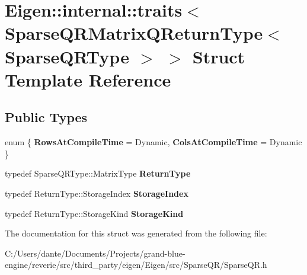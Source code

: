 \hypertarget{struct_eigen_1_1internal_1_1traits_3_01_sparse_q_r_matrix_q_return_type_3_01_sparse_q_r_type_01_4_01_4}{}\section{Eigen\+::internal\+::traits$<$ Sparse\+Q\+R\+Matrix\+Q\+Return\+Type$<$ Sparse\+Q\+R\+Type $>$ $>$ Struct Template Reference}
\label{struct_eigen_1_1internal_1_1traits_3_01_sparse_q_r_matrix_q_return_type_3_01_sparse_q_r_type_01_4_01_4}
\subsection*{Public Types}
\begin{DoxyCompactItemize}
\item 
\mbox{\label{struct_eigen_1_1internal_1_1traits_3_01_sparse_q_r_matrix_q_return_type_3_01_sparse_q_r_type_01_4_01_4_ae5f49cc517d4213d494799ab8954bd32}} 
enum \{ {\bfseries Rows\+At\+Compile\+Time} = Dynamic, 
{\bfseries Cols\+At\+Compile\+Time} = Dynamic
 \}
\item 
\mbox{\label{struct_eigen_1_1internal_1_1traits_3_01_sparse_q_r_matrix_q_return_type_3_01_sparse_q_r_type_01_4_01_4_a590365d451cdd97bf85150576de70d10}} 
typedef Sparse\+Q\+R\+Type\+::\+Matrix\+Type {\bfseries Return\+Type}
\item 
\mbox{\label{struct_eigen_1_1internal_1_1traits_3_01_sparse_q_r_matrix_q_return_type_3_01_sparse_q_r_type_01_4_01_4_a303535df1a3827af299a706d47a02bd4}} 
typedef Return\+Type\+::\+Storage\+Index {\bfseries Storage\+Index}
\item 
\mbox{\label{struct_eigen_1_1internal_1_1traits_3_01_sparse_q_r_matrix_q_return_type_3_01_sparse_q_r_type_01_4_01_4_a59f0fdbde763c7056db7e8f2b0c5ee9f}} 
typedef Return\+Type\+::\+Storage\+Kind {\bfseries Storage\+Kind}
\end{DoxyCompactItemize}


The documentation for this struct was generated from the following file\+:\begin{DoxyCompactItemize}
\item 
C\+:/\+Users/dante/\+Documents/\+Projects/grand-\/blue-\/engine/reverie/src/third\+\_\+party/eigen/\+Eigen/src/\+Sparse\+Q\+R/Sparse\+Q\+R.\+h\end{DoxyCompactItemize}
